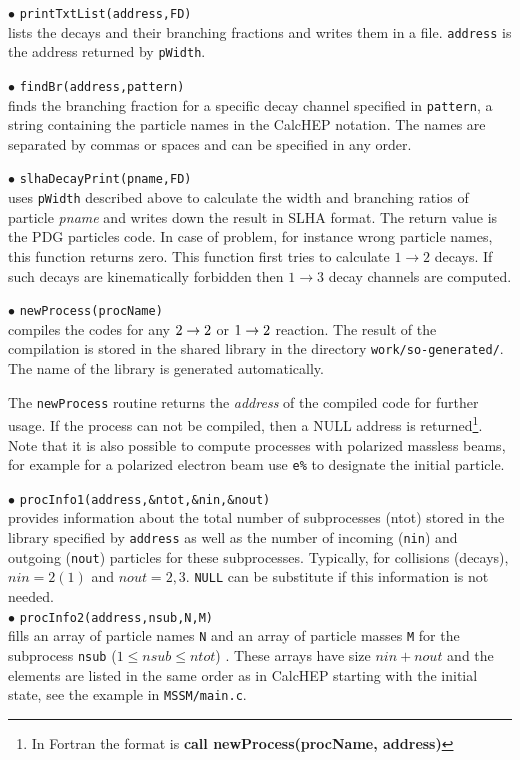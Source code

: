 \documentclass[12pt,a4paper]{article}
\begin{document}
\noindent
$\bullet$ \verb|printTxtList(address,FD)|\\
lists the decays and their branching fractions and writes them in a file.
{\tt address} is the address returned by {\tt pWidth}.  

\noindent
$\bullet$ \verb|findBr(address,pattern)|\\ 
finds the branching fraction for a specific decay channel specified in
{\tt pattern},  a string containing the particle names 
in the CalcHEP notation. The names are separated by commas or spaces and can be specified in any
order. 

\noindent
$\bullet$ \verb|slhaDecayPrint(pname,FD)|\\
uses \verb|pWidth| described above to calculate the width and branching ratios of particle {\it pname} and writes down the result
in SLHA format. The return value is the PDG particles code. In case of problem, for
instance wrong particle names, this function returns zero. This function
first tries to calculate $1\to2$  decays. If such decays are kinematically
forbidden then $1\to3$ decay channels are computed. 


\noindent
$\bullet$ \verb|newProcess(procName)|\\
compiles the  codes for any $2\rightarrow 2$ or  $1\rightarrow 2$  reaction.
The result of the compilation is stored in the  shared library  in the directory \verb|work/so-generated/|. The name of the library is generated
automatically.

The \verb|newProcess| routine returns the
{\it address} of the compiled code for further usage.   If the
process can not be compiled, then a NULL address is
returned\footnote{ In Fortran the  format is
{\bf call  newProcess(procName, address)}  }.
Note that it is also possible to compute processes with polarized massless beams, 
for example for a polarized electron beam use \verb|e%| to designate the initial
particle.




\noindent
$\bullet$ \verb|procInfo1(address,&ntot,&nin,&nout)|\\
provides information  about the total number of subprocesses
(ntot) stored in the library  specified by {\tt address} as well
as the number of incoming (\verb|nin|) and outgoing (\verb|nout|) particles for
these subprocesses. Typically, for collisions (decays), $nin=2(1)$ and $nout=2,3$.
\verb|NULL| can be substitute if this information is not needed. \\
$\bullet$ \verb|procInfo2(address,nsub,N,M)|\\
fills an array of
particle names \verb|N| and an array of particle  masses \verb|M| for the subprocess \verb|nsub| ($1\leq nsub \leq ntot$) . These
arrays have size $nin+nout$ and the elements are listed in the same order
as in CalcHEP starting with the initial state, see the example in 
\verb|MSSM/main.c|.\\
\end{document}
